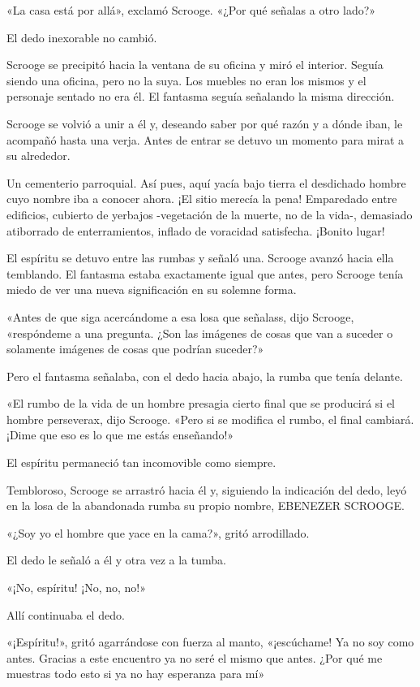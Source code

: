 \documentclass{novela}
\begin{document}
 «La casa está por allá», exclamó Scrooge. «¿Por qué señalas a otro lado?»

 El dedo inexorable no cambió.

 Scrooge se precipitó hacia la ventana de su oficina y miró el interior. Seguía siendo una oficina, pero no la suya. Los muebles no eran los mismos y el personaje sentado no era él. El fantasma seguía señalando la misma dirección.

 Scrooge se volvió a unir a él y, deseando saber por qué razón y a dónde iban, le acompañó hasta una verja. Antes de entrar se detuvo un momento para mirat a su alrededor.

 Un cementerio parroquial. Así pues, aquí yacía bajo tierra el desdichado hombre cuyo nombre iba a conocer ahora. ¡El sitio merecía la pena! Emparedado entre edificios, cubierto de yerbajos -vegetación de la muerte, no de la vida-, demasiado atiborrado de enterramientos, inflado de voracidad satisfecha. ¡Bonito lugar!

 El espíritu se detuvo entre las rumbas y señaló una. Scrooge avanzó hacia ella temblando. El fantasma estaba exactamente igual que antes, pero Scrooge tenía miedo de ver una nueva significación en su solemne forma.

 «Antes de que siga acercándome a esa losa que señalass, dijo Scrooge, «respóndeme a una pregunta. ¿Son las imágenes de cosas que van a suceder o solamente imágenes de cosas que podrían suceder?»

 Pero el fantasma señalaba, con el dedo hacia abajo, la rumba que tenía delante.

 «El rumbo de la vida de un hombre presagia cierto final que se producirá si el hombre perseverax, dijo Scrooge. «Pero si se modifica el rumbo, el final cambiará. ¡Dime que eso es lo que me estás enseñando!»

 El espíritu permaneció tan incomovible como siempre.

 Tembloroso, Scrooge se arrastró hacia él y, siguiendo la indicación del dedo, leyó en la losa de la abandonada rumba su propio nombre, EBENEZER SCROOGE\@.

 «¿Soy yo el hombre que yace en la cama?», gritó arrodillado.

 El dedo le señaló a él y otra vez a la tumba.

 «¡No, espíritu! ¡No, no, no!»

 Allí continuaba el dedo.

 «¡Espíritu!», gritó agarrándose con fuerza al manto, «¡escúchame! Ya no soy como antes. Gracias a este encuentro ya no seré el mismo que antes. ¿Por qué me muestras todo esto si ya no hay esperanza para mí»
\end{document}
